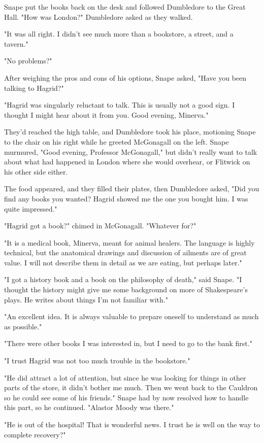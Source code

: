 Snape put the books back on the desk and followed Dumbledore to the Great Hall. "How was London?" Dumbledore asked as they walked.

"It was all right. I didn't see much more than a bookstore, a street, and a tavern."

"No problems?"

After weighing the pros and cons of his options, Snape asked, "Have you been talking to Hagrid?"

"Hagrid was singularly reluctant to talk. This is usually not a good sign. I thought I might hear about it from you. Good evening, Minerva."

They'd reached the high table, and Dumbledore took his place, motioning Snape to the chair on his right while he greeted McGonagall on the left. Snape murmured, "Good evening, Professor McGonagall," but didn't really want to talk about what had happened in London where she would overhear, or Flitwick on his other side either.

The food appeared, and they filled their plates, then Dumbledore asked, "Did you find any books you wanted? Hagrid showed me the one you bought him. I was quite impressed."

"Hagrid got a book?" chimed in McGonagall. "Whatever for?"

"It is a medical book, Minerva, meant for animal healers. The language is highly technical, but the anatomical drawings and discussion of ailments are of great value. I will not describe them in detail as we are eating, but perhaps later."

"I got a history book and a book on the philosophy of death," said Snape. "I thought the history might give me some background on more of Shakespeare's plays. He writes about things I'm not familiar with."

"An excellent idea. It is always valuable to prepare oneself to understand as much as possible."

"There were other books I was interested in, but I need to go to the bank first."

"I trust Hagrid was not too much trouble in the bookstore."

"He did attract a lot of attention, but since he was looking for things in other parts of the store, it didn't bother me much. Then we went back to the Cauldron so he could see some of his friends." Snape had by now resolved how to handle this part, so he continued. "Alastor Moody was there."

"He is out of the hospital! That is wonderful news. I trust he is well on the way to complete recovery?"

